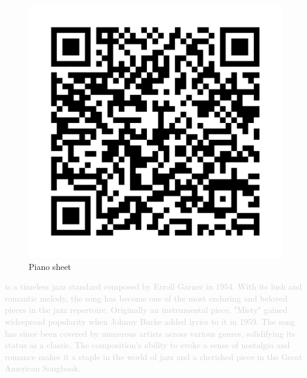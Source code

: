 \begin{figure}
\includegraphics[width=1\linewidth]{QR_Codes/QR_Misty_C.png}\\
Piano sheet
\end{figure}

\textcolor{lightgray}{is a timeless jazz standard composed by Erroll Garner in 1954. With its lush and romantic melody, the song has become one of the most enduring and beloved pieces in the jazz repertoire. Originally an instrumental piece, "Misty" gained widespread popularity when Johnny Burke added lyrics to it in 1959. The song has since been covered by numerous artists across various genres, solidifying its status as a classic. The composition's ability to evoke a sense of nostalgia and romance makes it a staple in the world of jazz and a cherished piece in the Great American Songbook.}

